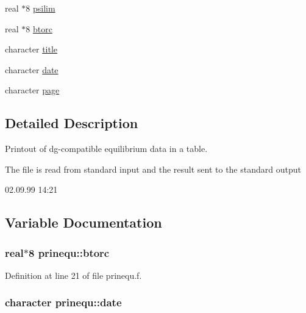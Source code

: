 \begin{CompactItemize}
\item 
real $\ast$8 \hyperlink{namespaceprinequ_05b4c9c9a512ba7b68c5d65d9ce3b41b}{psilim}
\item 
real $\ast$8 \hyperlink{namespaceprinequ_e10a61ae7e5b9a1d4e8995f3bf7a1a55}{btorc}
\item 
character \hyperlink{namespaceprinequ_c547b01609416ef885762a15c771e7fa}{title}
\item 
character \hyperlink{namespaceprinequ_0bf10630a1327bf8bcdec7ccc05aa19d}{date}
\item 
character \hyperlink{namespaceprinequ_739dea1dcb841b3637127568990b1f19}{page}
\end{CompactItemize}


\subsection{Detailed Description}
Printout of dg-compatible equilibrium data in a table. 

The file is read from standard input and the result sent to the standard output

\begin{Desc}
\item[Version:]02.09.99 14:21 \end{Desc}


\subsection{Variable Documentation}
\hypertarget{namespaceprinequ_e10a61ae7e5b9a1d4e8995f3bf7a1a55}{
\subsubsection[btorc]{\setlength{\rightskip}{0pt plus 5cm}real$\ast$8 {\bf prinequ::btorc}}}
\label{namespaceprinequ_e10a61ae7e5b9a1d4e8995f3bf7a1a55}




Definition at line 21 of file prinequ.f.\hypertarget{namespaceprinequ_0bf10630a1327bf8bcdec7ccc05aa19d}{
\subsubsection[date]{\setlength{\rightskip}{0pt plus 5cm}character {\bf prinequ::date}}}
\label{namespaceprinequ_0bf10630a1327bf8bcdec7ccc05aa19d}




